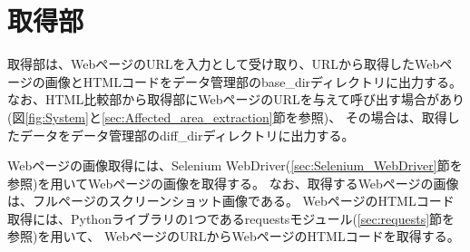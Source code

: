 

\section{取得部}\label{sec:Web_data_get_section}
取得部は、WebページのURLを入力として受け取り、URLから取得したWebページの画像とHTMLコードをデータ管理部のbase\_dirディレクトリに出力する。
なお、HTML比較部から取得部にWebページのURLを与えて呼び出す場合があり(図\ref{fig:System}と\ref{sec:Affected_area_extraction}節を参照)、
その場合は、取得したデータをデータ管理部のdiff\_dirディレクトリに出力する。
\par
Webページの画像取得には、Selenium WebDriver(\ref{sec:Selenium_WebDriver}節を参照)を用いてWebページの画像を取得する。
なお、取得するWebページの画像は、フルページのスクリーンショット画像である。
WebページのHTMLコード取得には、Pythonライブラリの1つであるrequestsモジュール(\ref{sec:requests}節を参照)を用いて、
WebページのURLからWebページのHTMLコードを取得する。


